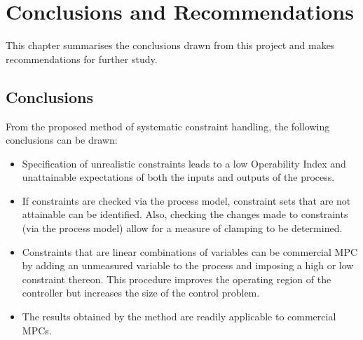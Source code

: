 \chapter{Conclusions and Recommendations}\label{chap:conclusion}
\begin{overview}
  This chapter summarises the conclusions drawn from this project and makes recommendations for further study.
\end{overview}

\section{Conclusions}
From the proposed method of systematic constraint handling, the following conclusions can be drawn:
\begin{itemize}
  \item Specification of unrealistic constraints leads to a low Operability Index and unattainable expectations of both the inputs and outputs of the process.
  \item If constraints are checked via the process model, constraint sets that are not attainable can be identified. Also, checking the changes made to constraints (via the process model) allow for a measure of clamping to be determined.
  \item Constraints that are linear combinations of variables can be commercial MPC by adding an unmeasured variable to the process and imposing a high or low constraint thereon.
This procedure improves the operating region of the controller but increases the size of the control problem.
  \item The results obtained by the method are readily applicable to commercial MPCs.
\end{itemize}


